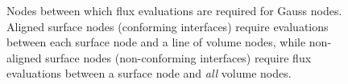 \documentclass{svjour3}                     %
\renewcommand{\tilde}{\widetilde}
\newcommand{\LRp}[1]{\left( #1 \right)}
\begin{document}
\begin{figure}
\centering
{}
\hspace{4em}
\caption{Nodes between which flux evaluations are required for Gauss nodes. Aligned surface nodes (conforming interfaces) require evaluations between each surface node and a line of volume nodes, while non-aligned surface nodes (non-conforming interfaces) require flux evaluations between a surface node and \textit{all} volume nodes.  } %
\label{fig:fluxsparsity}
\end{figure}
\end{document}
